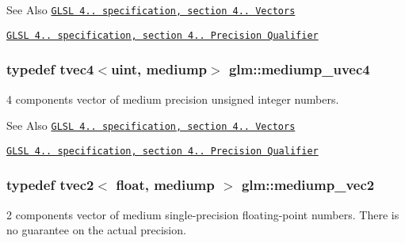 \begin{DoxySeeAlso}{See Also}
\href{http://www.opengl.org/registry/doc/GLSLangSpec.4.20.8.pdf}{\tt G\-L\-S\-L 4.. specification, section 4.. Vectors} 

\href{http://www.opengl.org/registry/doc/GLSLangSpec.4.20.8.pdf}{\tt G\-L\-S\-L 4.. specification, section 4.. Precision Qualifier} 
\end{DoxySeeAlso}
\hypertarget{group__core__precision_ga825e1e6ef3513c5de283d1b2fa1d4879}{
\subsubsection[{mediump\-\_\-uvec4}]{\setlength{\rightskip}{0pt plus 5cm}typedef tvec4$<$uint, mediump$>$ {\bf glm\-::mediump\-\_\-uvec4}}}\label{group__core__precision_ga825e1e6ef3513c5de283d1b2fa1d4879}
4 components vector of medium precision unsigned integer numbers.

\begin{DoxySeeAlso}{See Also}
\href{http://www.opengl.org/registry/doc/GLSLangSpec.4.20.8.pdf}{\tt G\-L\-S\-L 4.. specification, section 4.. Vectors} 

\href{http://www.opengl.org/registry/doc/GLSLangSpec.4.20.8.pdf}{\tt G\-L\-S\-L 4.. specification, section 4.. Precision Qualifier} 
\end{DoxySeeAlso}
\hypertarget{group__core__precision_ga949639029259b8bf5c4bc96bd2cc5a59}{
\subsubsection[{mediump\-\_\-vec2}]{\setlength{\rightskip}{0pt plus 5cm}typedef tvec2$<$ float, mediump $>$ {\bf glm\-::mediump\-\_\-vec2}}}\label{group__core__precision_ga949639029259b8bf5c4bc96bd2cc5a59}
2 components vector of medium single-\/precision floating-\/point numbers. There is no guarantee on the actual precision.

